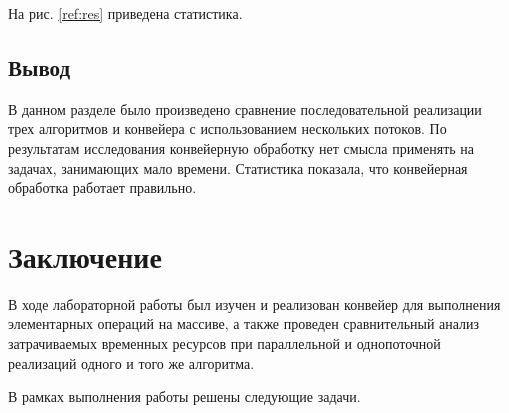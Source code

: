 \documentclass[12pt]{report}
\begin{document}
На рис. \ref{ref:res} приведена статистика.

\begin{figure}[ht!]
\end{figure}

\section{Вывод}

В данном разделе было произведено сравнение последовательной реализации трех алгоритмов и конвейера с использованием нескольких потоков. По результатам исследования конвейерную обработку нет смысла применять на задачах, занимающих мало времени. Статистика показала, что конвейерная обработка работает правильно.

\chapter*{Заключение}
В ходе лабораторной работы был изучен и реализован конвейер для выполнения элементарных операций на массиве, а также проведен сравнительный анализ затрачиваемых временных ресурсов при параллельной и однопоточной реализаций одного и того же алгоритма. 

В рамках выполнения работы решены следующие задачи.
\end{document}
